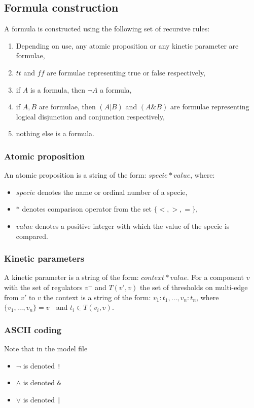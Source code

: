 \documentclass[12pt]{article}
\begin{document}
\subsection{Formula construction}
\label{FormulaConstruction}
A formula is constructed using the following set of recursive rules:
\begin{enumerate}
\item Depending on use, any atomic proposition or any kinetic parameter are formulae,
\item $tt$ and $ff$ are formulae representing true or false respectively,
\item if $A$ is a formula, then $\neg A$ a formula,
\item if $A,B$ are formulae, then $(A|B)$ and $(A\&B)$ are formulae representing logical disjunction and conjunction respectively,
\item nothing else is a formula.
\end{enumerate}

\subsubsection*{Atomic proposition}
An atomic proposition is a string of the form: $specie*value$, where:
\begin{itemize}
\item $specie$ denotes the name or ordinal number of a specie,
\item $*$ denotes comparison operator from the set $\{<,>,=\}$,
\item $value$ denotes a positive integer with which the value of the specie is compared.
\end{itemize}

\subsubsection*{Kinetic parameters}
A kinetic parameter is a string of the form: $context*value$. For a component $v$ with the set of regulators $v^-$ and $T(v',v)$ the set of thresholds on multi-edge from $v'$ to $v$ the context is a string of the form:
$ v_1:t_1,\dots, v_n:t_n $, where $\{v_1,\dots,v_n\} = v^-$ and $t_i \in T(v_i,v)$.

\subsubsection*{ASCII coding}
Note that in the model file
\begin{itemize}
\item $\neg$ is denoted \texttt{!}
\item $\wedge$ is denoted \texttt{\&}
\item $\vee$ is denoted \texttt{|}
\end{itemize}
\end{document}
